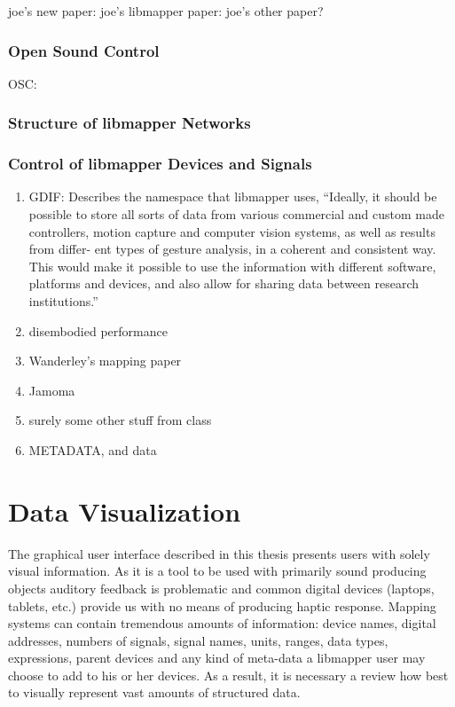 	joe's new paper: \cite{new_libmapper}
	joe's libmapper paper: 
	joe's other paper?
	\subsubsection{Open Sound Control}
	OSC: 
	\subsubsection{Structure of libmapper Networks}
	\subsubsection{Control of libmapper Devices and Signals}
\begin{enumerate}
	\item GDIF:  Describes the namespace that libmapper uses, ``Ideally, it should be possible to store all sorts of data from various commercial and custom made controllers, motion capture and computer vision systems, as well as results from differ- ent types of gesture analysis, in a coherent and consistent way. This would make it possible to use the information with different software, platforms and devices, and also allow for sharing data between research institutions.'' 
	\item disembodied performance
	\item Wanderley's mapping paper  
	\item Jamoma 
	\item surely some other stuff from class
	\item METADATA, and data
\end{enumerate}

\section{Data Visualization}


The graphical user interface described in this thesis presents users with solely visual information. As it is a tool to be used with primarily sound producing objects auditory feedback is problematic and common digital devices (laptops, tablets, etc.) provide us with no means of producing haptic response. Mapping systems can contain tremendous amounts of information: device names, digital addresses, numbers of signals, signal names, units, ranges, data types, expressions, parent devices and any kind of meta-data a libmapper user may choose to add to his or her devices. As a result, it is necessary a review how best to visually represent vast amounts of structured data.

